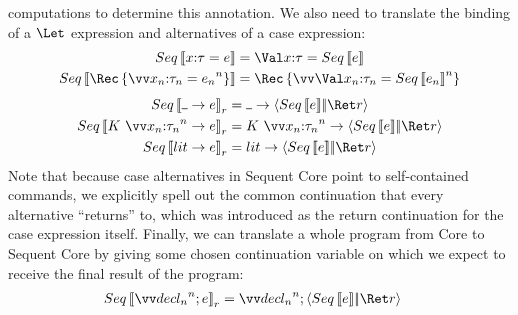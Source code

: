 \documentclass{article}
\begin{document}
computations to determine this annotation.  We also need to translate the
binding of a $\Let$ expression and alternatives of a case expression:
\begin{align*}
  Seq\trans{\nonrec{\ann x \ty = \expr}}
  &=
  \nonrec{\bindv{\ann x \ty}{Seq\trans{\expr}}}
  \\
  Seq\trans{\rec{\vect[n]{\ann{x_n}{\ty_n} = \expr_n}}}
  &=
  \rec{\vect[n]{\bindv{\ann{x_n}{\ty_n}}{Seq\trans{\expr_n}}}}
\end{align*}
\begin{align*}
  Seq\trans{\blank \to \expr}_{r}
  &=
  \blank \to \cut{Seq\trans{\expr}}{\ret r}
  \\
  Seq\trans{
    K ~ \vect[n]{\ann{x_n}{\ty_n}} \to \expr
  }_{r}
  &=
  K ~ \vect[n]{\ann{x_n}{\ty_n}}
  \to
  \cut{Seq\trans{\expr}}{\ret r}
  \\
  Seq\trans{\lit \to \expr}_{r}
  &=
  \lit \to \cut{Seq\trans{\expr}}{\ret r}
\end{align*}
Note that because case alternatives in Sequent Core point to self-contained
commands, we explicitly spell out the common continuation that every alternative
``returns'' to, which was introduced as the return continuation for the case
expression itself.  Finally, we can translate a whole program from Core to
Sequent Core by giving some chosen continuation variable on which we expect to
receive the final result of the program:
\begin{align*}
  Seq\trans{\vect[n]{\decl_n}; e}_{r}
  &=
  \vect[n]{\decl_n}; \cut{Seq\trans{e}}{\ret r}
\end{align*}
\end{document}
